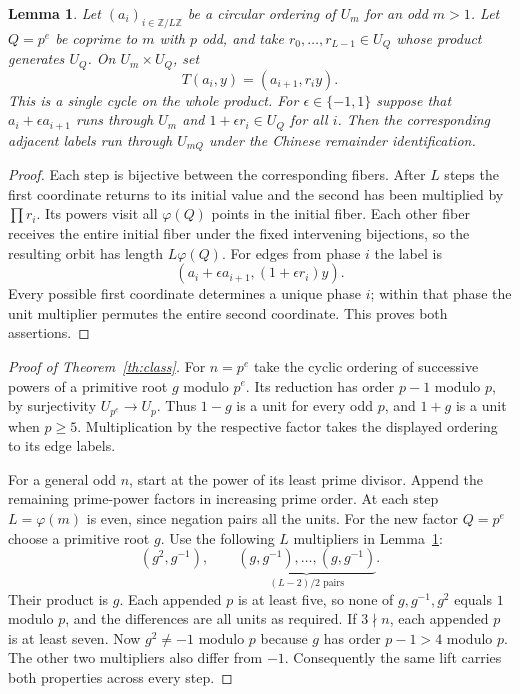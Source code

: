 \documentclass[11pt]{article}
\newtheorem{lemma}[theorem]{Lemma}
\begin{document}
\begin{lemma}\label{lem:lift}
Let $(a_i)_{i\in\mathbb Z/L\mathbb Z}$ be a circular ordering of $U_m$ for an odd $m>1$. Let $Q=p^e$ be coprime to $m$ with $p$ odd, and take $r_0,\ldots,r_{L-1}\in U_Q$ whose product generates $U_Q$. On $U_m\times U_Q$, set
\[
 T(a_i,y)=(a_{i+1},r_i y).
\]
This is a single cycle on the whole product. For $\epsilon\in\{-1,1\}$ suppose that $a_i+\epsilon a_{i+1}$ runs through $U_m$ and $1+\epsilon r_i\in U_Q$ for all $i$. Then the corresponding adjacent labels run through $U_{mQ}$ under the Chinese remainder identification.
\end{lemma}
\begin{proof}
Each step is bijective between the corresponding fibers. After $L$ steps the first coordinate returns to its initial value and the second has been multiplied by $\prod r_i$. Its powers visit all $\varphi(Q)$ points in the initial fiber. Each other fiber receives the entire initial fiber under the fixed intervening bijections, so the resulting orbit has length $L\varphi(Q)$. For edges from phase $i$ the label is
\[
  (a_i+\epsilon a_{i+1},(1+\epsilon r_i)y).
\]
Every possible first coordinate determines a unique phase $i$; within that phase the unit multiplier permutes the entire second coordinate. This proves both assertions.
\end{proof}

\begin{proof}[Proof of Theorem~\ref{th:class}]
For $n=p^e$ take the cyclic ordering of successive powers of a primitive root $g$ modulo $p^e$. Its reduction has order $p-1$ modulo $p$, by surjectivity $U_{p^e}\to U_p$. Thus $1-g$ is a unit for every odd $p$, and $1+g$ is a unit when $p\ge5$. Multiplication by the respective factor takes the displayed ordering to its edge labels.

For a general odd $n$, start at the power of its least prime divisor. Append the remaining prime-power factors in increasing prime order. At each step $L=\varphi(m)$ is even, since negation pairs all the units. For the new factor $Q=p^e$ choose a primitive root $g$. Use the following $L$ multipliers in Lemma~\ref{lem:lift}:
\[
 (g^2,g^{-1}),\qquad \underbrace{(g,g^{-1}),\ldots,(g,g^{-1})}_{(L-2)/2\text{ pairs}}.
\]
Their product is $g$. Each appended $p$ is at least five, so none of $g,g^{-1},g^2$ equals $1$ modulo $p$, and the differences are all units as required. If $3\nmid n$, each appended $p$ is at least seven. Now $g^2\ne-1$ modulo $p$ because $g$ has order $p-1>4$ modulo $p$. The other two multipliers also differ from $-1$. Consequently the same lift carries both properties across every step.
\end{proof}
\end{document}
